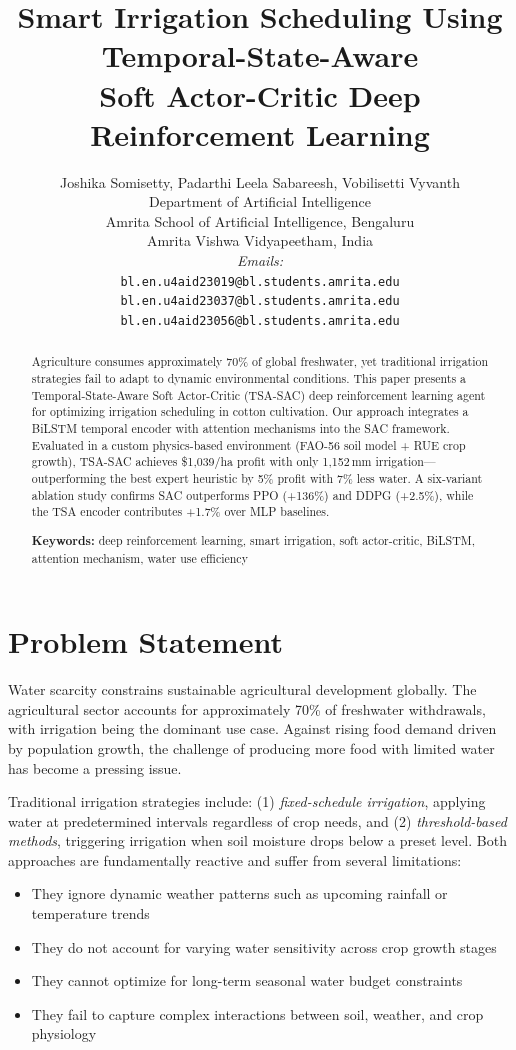 \documentclass[12pt, a4paper]{article}
\title{\textbf{Smart Irrigation Scheduling Using Temporal-State-Aware\\Soft Actor-Critic Deep Reinforcement Learning}}
\author{
Joshika Somisetty, Padarthi Leela Sabareesh, Vobilisetti Vyvanth \\
Department of Artificial Intelligence \\
Amrita School of Artificial Intelligence, Bengaluru\\
Amrita Vishwa Vidyapeetham, India \\
\textit{Emails:}\\
\texttt{bl.en.u4aid23019@bl.students.amrita.edu}\\
\texttt{bl.en.u4aid23037@bl.students.amrita.edu}\\
\texttt{bl.en.u4aid23056@bl.students.amrita.edu}
}
\date{}
\begin{document}
\maketitle

\begin{abstract}
Agriculture consumes approximately 70\% of global freshwater, yet traditional irrigation strategies fail to adapt to dynamic environmental conditions. This paper presents a Temporal-State-Aware Soft Actor-Critic (TSA-SAC) deep reinforcement learning agent for optimizing irrigation scheduling in cotton cultivation. Our approach integrates a BiLSTM temporal encoder with attention mechanisms into the SAC framework. Evaluated in a custom physics-based environment (FAO-56 soil model + RUE crop growth), TSA-SAC achieves \$1,039/ha profit with only 1,152\,mm irrigation---outperforming the best expert heuristic by 5\% profit with 7\% less water. A six-variant ablation study confirms SAC outperforms PPO (+136\%) and DDPG (+2.5\%), while the TSA encoder contributes +1.7\% over MLP baselines.

\noindent\textbf{Keywords:} deep reinforcement learning, smart irrigation, soft actor-critic, BiLSTM, attention mechanism, water use efficiency
\end{abstract}

\section{Problem Statement}

Water scarcity constrains sustainable agricultural development globally. The agricultural sector accounts for approximately 70\% of freshwater withdrawals, with irrigation being the dominant use case. Against rising food demand driven by population growth, the challenge of producing more food with limited water has become a pressing issue.

Traditional irrigation strategies include: (1) \textit{fixed-schedule irrigation}, applying water at predetermined intervals regardless of crop needs, and (2) \textit{threshold-based methods}, triggering irrigation when soil moisture drops below a preset level. Both approaches are fundamentally reactive and suffer from several limitations:

\begin{itemize}
    \item They ignore dynamic weather patterns such as upcoming rainfall or temperature trends
    \item They do not account for varying water sensitivity across crop growth stages
    \item They cannot optimize for long-term seasonal water budget constraints
    \item They fail to capture complex interactions between soil, weather, and crop physiology
\end{itemize}
\end{document}
